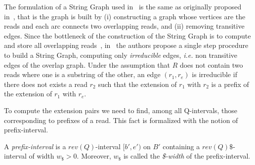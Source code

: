 \documentclass[runningheads,envcountsame,a4paper]{llncs}
\newcommand{\notaestesa}[2]{%
 \marginpar{\color{red!75!black}\textbf{\texttimes}}%
 {\color{red!75!black}%
 [\,\textbullet\,\textsf{\textbf{#1:}} %
 \textsf{\footnotesize#2}\,\textbullet\,]}%
}
\newcommand{\ie}{\textit{i.e.}\xspace}
\newcommand{\wrt}{w.r.t.\xspace}
\begin{document}
The formulation of a String Graph used in~\cite{Simpson2010} is the same as
originally proposed in~\cite{Myers2005}, that is the graph is built by (i)
constructing a graph whose vertices are the reads and each arc connects two overlapping reads, and (ii)
removing transitive edges.
Since the bottleneck of the construction of the String Graph is to compute and store all overlapping reads~\cite{Myesr2005},
in~\cite{Simpson2010} the authors propose a single step procedure to build a
String Graph, computing only \emph{irreducible} edges, \ie non
transitive edges of the overlap graph.
Under the assumption that $R$ does not contain two reads where one is a substring of the other,
an edge $(r_{1}, r_e)$ is irreducible if there does not exists a read $r_{2}$
such that
the extension of $r_{1}$ with $r_2$ is a prefix of
the extension of $r_{1}$ with $r_e$.








To compute the extension pairs we need to find, among all Q-intervals, those corresponding to prefixes of a read.
This fact is formalized with the notion of prefix-interval.

\begin{definition}
A \emph{prefix-interval} is a $rev(Q)$-interval $[b',e')$ on $B'$ containing
a $rev(Q)\$$-interval of width $w_{\$}>0$.
Moreover, $w_{\$}$ is called the \emph{\$-width}
of the prefix-interval.
\end{definition}
\end{document}
